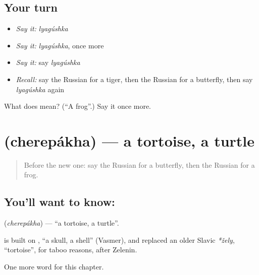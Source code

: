 \subsection*{Your turn}
\begin{itemize}
\raggedright
  \item \emph{Say it:} \emph{lyagúshka}
  \item \emph{Say it:} \emph{lyagúshka}, once more
  \item \emph{Say it:} say \emph{lyagúshka}
  \item \emph{Recall:} say the Russian for a tiger, then the Russian for a butterfly, then say \emph{lyagúshka} again
\end{itemize}

\begin{tcolorbox}[breakable,colback=teal!4,colframe=teal!35!black,title={Before you move on}]
What does  mean? (\textquotedblleft{}A frog\textquotedblright{}.) Say it once more.
\end{tcolorbox}
\section[\texorpdfstring{\ru{черепаха} (cherepákha)}{черепаха (cherepákha)}]{ (cherepákha) — a tortoise, a turtle}

\label{lesson:RU-C117-tortoise}



\begin{quote}
Before the new one: say the Russian for a butterfly, then the Russian for a frog.
\end{quote}

\subsection*{You'll want to know: }
\textbf{} (\emph{cherepákha}) — \textquotedblleft{}a tortoise, a turtle\textquotedblright{}.

\begin{cousinweb}
\textbf{} is built on \emph{}, \textquotedblleft{}a skull, a shell\textquotedblright{} (Vasmer), and replaced an older Slavic \emph{*žely}, \textquotedblleft{}tortoise\textquotedblright{}, for taboo reasons, after Zelenin.
\end{cousinweb}

\begin{grammarlens}[title={What you've built}]
One more word for this chapter.
\end{grammarlens}

